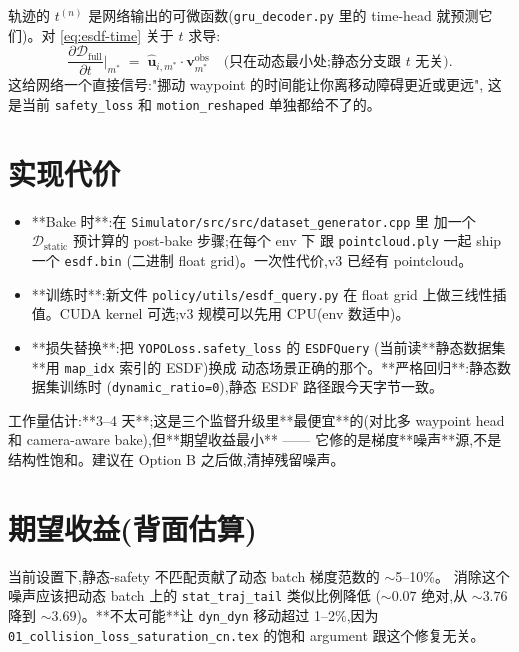 \documentclass[UTF8, 11pt]{ctexart}
\newcommand{\esdf}{\mathcal{D}}
\begin{document}
轨迹的 $t^{(n)}$ 是网络输出的可微函数(\texttt{gru\_decoder.py} 里的 time-head
就预测它们)。对 \eqref{eq:esdf-time} 关于 $t$ 求导:
\begin{equation}
\frac{\partial \esdf_{\text{full}}}{\partial t}\Big|_{m^*}
\;=\;
\hat{\bm{u}}_{i,m^*} \cdot \bm{v}_{m^*}^{\text{obs}}
\quad
\text{(只在动态最小处;静态分支跟 $t$ 无关)}.
\end{equation}
这给网络一个直接信号:"挪动 waypoint 的时间能让你离移动障碍更近或更远",
这是当前 \texttt{safety\_loss} 和 \texttt{motion\_reshaped} 单独都给不了的。

\section{实现代价}

\begin{itemize}
  \item **Bake 时**:在 \texttt{Simulator/src/src/dataset\_generator.cpp} 里
        加一个 $\esdf_{\text{static}}$ 预计算的 post-bake 步骤;在每个 env 下
        跟 \texttt{pointcloud.ply} 一起 ship 一个 \texttt{esdf.bin}
        (二进制 float grid)。一次性代价,v3 已经有 pointcloud。
  \item **训练时**:新文件 \texttt{policy/utils/esdf\_query.py} 在 float grid
        上做三线性插值。CUDA kernel 可选;v3 规模可以先用 CPU(env 数适中)。
  \item **损失替换**:把 \texttt{YOPOLoss.safety\_loss} 的 \texttt{ESDFQuery}
        (当前读**静态数据集**用 \texttt{map\_idx} 索引的 ESDF)换成
        动态场景正确的那个。**严格回归**:静态数据集训练时
        (\texttt{dynamic\_ratio=0}),静态 ESDF 路径跟今天字节一致。
\end{itemize}

工作量估计:**3--4 天**;这是三个监督升级里**最便宜**的(对比多 waypoint head
和 camera-aware bake),但**期望收益最小** —— 它修的是梯度**噪声**源,不是
结构性饱和。建议在 Option B 之后做,清掉残留噪声。

\section{期望收益(背面估算)}

当前设置下,静态-safety 不匹配贡献了动态 batch 梯度范数的 $\sim$5--10\%。
消除这个噪声应该把动态 batch 上的 \texttt{stat\_traj\_tail} 类似比例降低
($\sim$$0.07$ 绝对,从 $\sim$$3.76$ 降到 $\sim$$3.69$)。**不太可能**让
\texttt{dyn\_dyn} 移动超过 1--2\%,因为
\texttt{01\_collision\_loss\_saturation\_cn.tex} 的饱和 argument 跟这个修复无关。
\end{document}
